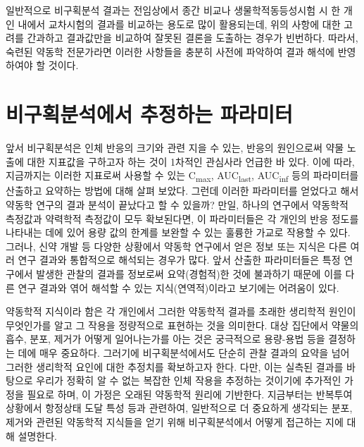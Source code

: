 \documentclass[
  11pt,
  krantz2, a4paper, twoside]{krantz}
\theoremstyle{definition}
\theoremstyle{definition}
\theoremstyle{definition}
\theoremstyle{definition}
\theoremstyle{remark}
\begin{document}
일반적으로 비구획분석 결과는 전임상에서 종간 비교나 생물학적동등성시험 시 한 개인 내에서 교차시험의 결과를 비교하는 용도로 많이 활용되는데, 위의 사항에 대한 고려를 간과하고 결과값만을 비교하여 잘못된 결론을 도출하는 경우가 빈번하다. 따라서, 숙련된 약동학 전문가라면 이러한 사항들을 충분히 사전에 파악하여 결과 해석에 반영하여야 할 것이다.

\hypertarget{uxbe44uxad6cuxd68duxbd84uxc11duxc5d0uxc11c-uxcd94uxc815uxd558uxb294-uxd30cuxb77cuxbbf8uxd130}{%
\section{비구획분석에서 추정하는 파라미터}\label{uxbe44uxad6cuxd68duxbd84uxc11duxc5d0uxc11c-uxcd94uxc815uxd558uxb294-uxd30cuxb77cuxbbf8uxd130}}

앞서 비구획분석은 인체 반응의 크기와 관련 지을 수 있는, 반응의 원인으로써 약물 노출에 대한 지표값을 구하고자 하는 것이 1차적인 관심사라 언급한 바 있다. 이에 따라, 지금까지는 이러한 지표로써 사용할 수 있는 C\textsubscript{max}, AUC\textsubscript{last}, AUC\textsubscript{inf} 등의 파라미터를 산출하고 요약하는 방법에 대해 살펴 보았다. 그런데 이러한 파라미터를 얻었다고 해서 약동학 연구의 결과 분석이 끝났다고 할 수 있을까? 만일, 하나의 연구에서 약동학적 측정값과 약력학적 측정값이 모두 확보된다면, 이 파라미터들은 각 개인의 반응 정도를 나타내는 데에 있어 용량 값의 한계를 보완할 수 있는 훌륭한 가교로 작용할 수 있다. 그러나, 신약 개발 등 다양한 상황에서 약동학 연구에서 얻은 정보 또는 지식은 다른 여러 연구 결과와 통합적으로 해석되는 경우가 많다. 앞서 산출한 파라미터들은 특정 연구에서 발생한 관찰의 결과를 정보로써 요약(경험적)한 것에 불과하기 때문에 이를 다른 연구 결과와 엮어 해석할 수 있는 지식(연역적)이라고 보기에는 어려움이 있다.

약동학적 지식이라 함은 각 개인에서 그러한 약동학적 결과를 초래한 생리학적 원인이 무엇인가를 알고 그 작용을 정량적으로 표현하는 것을 의미한다. 대상 집단에서 약물의 흡수, 분포, 제거가 어떻게 일어나는가를 아는 것은 궁극적으로 용량-용법 등을 결정하는 데에 매우 중요하다. 그러기에 비구획분석에서도 단순히 관찰 결과의 요약을 넘어 그러한 생리학적 요인에 대한 추정치를 확보하고자 한다. 다만, 이는 실측된 결과를 바탕으로 우리가 정확히 알 수 없는 복잡한 인체 작용을 추정하는 것이기에 추가적인 가정을 필요로 하며, 이 가정은 오래된 약동학적 원리에 기반한다. 지금부터는 반복투여 상황에서 항정상태 도달 특성 등과 관련하여, 일반적으로 더 중요하게 생각되는 분포, 제거와 관련된 약동학적 지식들을 얻기 위해 비구획분석에서 어떻게 접근하는 지에 대해 설명한다.
\end{document}
